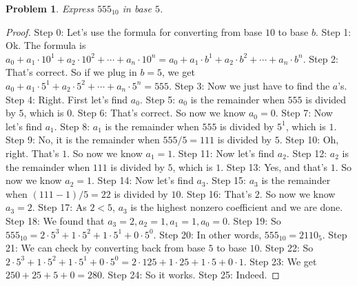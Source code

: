 \documentclass{article}
\newtheorem{theorem}{Problem}
\begin{document}
\begin{theorem}
Express $555_{10}$ in base $5$.
\end{theorem}

\begin{proof}
Step 0: Let's use the formula for converting from base $10$ to base $b$.
Step 1: Ok. The formula is $a_0 + a_1 \cdot 10^1 + a_2 \cdot 10^2 + \cdots + a_n \cdot 10^n = a_0 + a_1 \cdot b^1 + a_2 \cdot b^2 + \cdots + a_n \cdot b^n$.
Step 2: That's correct. So if we plug in $b = 5$, we get $a_0 + a_1 \cdot 5^1 + a_2 \cdot 5^2 + \cdots + a_n \cdot 5^n = 555$.
Step 3: Now we just have to find the $a$'s.
Step 4: Right. First let's find $a_0$.
Step 5: $a_0$ is the remainder when $555$ is divided by $5$, which is $0$.
Step 6: That's correct. So now we know $a_0 = 0$.
Step 7: Now let's find $a_1$.
Step 8: $a_1$ is the remainder when $555$ is divided by $5^1$, which is $1$.
Step 9: No, it is the remainder when $555/5=111$ is divided by $5$.
Step 10: Oh, right. That's $1$. So now we know $a_1 = 1$.
Step 11: Now let's find $a_2$.
Step 12: $a_2$ is the remainder when $111$ is divided by $5$, which is $1$.
Step 13: Yes, and that's $1$. So now we know $a_2 = 1$.
Step 14: Now let's find $a_3$.
Step 15: $a_3$ is the remainder when $(111-1)/5=22$ is divided by $10$.
Step 16: That's $2$. So now we know $a_3 = 2$.
Step 17: As $2<5$, $a_3$ is the highest nonzero coefficient and we are done.
Step 18: We found that $a_3 = 2, a_2 = 1, a_1 = 1, a_0 = 0$.
Step 19: So $555_{10}=2\cdot 5^3 + 1\cdot 5^2 + 1\cdot 5^1 + 0\cdot 5^0$.
Step 20: In other words, $555_{10}=2110_{5}$.
Step 21: We can check by converting back from base $5$ to base $10$.
Step 22: So $2\cdot 5^3 + 1\cdot 5^2 + 1\cdot 5^1 + 0\cdot 5^0=2\cdot 125 + 1\cdot 25 + 1\cdot 5 + 0\cdot 1$.
Step 23: We get $250+25+5+0=280$.
Step 24: So it works.
Step 25: Indeed.
\end{proof}
\end{document}
